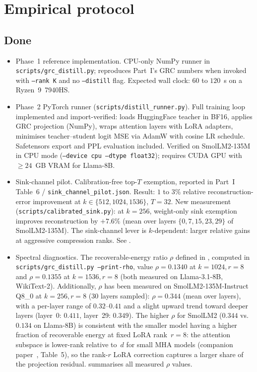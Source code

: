 \documentclass[11pt]{article}
\begin{document}
\section{Empirical protocol}
\label{sec:status}

\subsection{Done}
\begin{itemize}
\item Phase~1 reference implementation. CPU-only NumPy
      runner in \texttt{scripts/grc\_distill.py}; reproduces Part~I's
      GRC numbers when invoked with \texttt{--rank K} and no
      \texttt{--distill} flag. Expected wall clock: $60$ to $120$~s on
      a Ryzen~9~7940HS.

\item Phase~2 PyTorch runner (\texttt{scripts/distill\_runner.py}).
      Full training loop implemented and import-verified: loads
      HuggingFace teacher in BF16, applies GRC projection (NumPy),
      wraps attention layers with LoRA adapters, minimises
      teacher--student logit MSE via AdamW with cosine LR schedule.
      Safetensors export and PPL evaluation included.  Verified on
      SmolLM2-135M in CPU mode (\texttt{--device cpu --dtype float32});
      requires CUDA GPU with ${\ge}24$~GB VRAM for Llama-8B.

\item Sink-channel pilot. Calibration-free top-$T$ exemption,
      reported in Part~I Table~6 / \texttt{sink\_channel\_pilot.json}.
      Result: $1$ to $3\%$ relative reconstruction-error improvement at
      $k\in\{512,1024,1536\}$, $T{=}32$.  New measurement
      (\texttt{scripts/calibrated\_sink.py}): at $k{=}256$, weight-only
      sink exemption improves reconstruction by $+7.6\%$ (mean over
      layers $\{0,7,15,23,29\}$ of SmolLM2-135M).  The sink-channel
      lever is $k$-dependent: larger relative gains at aggressive
      compression ranks.  See .

\item Spectral diagnostics. The recoverable-energy ratio
      $\rho$ defined in , computed in
      \texttt{scripts/grc\_distill.py --print-rho}, value
      $\rho{=}0.1340$ at $k{=}1024, r{=}8$ and $\rho{=}0.1355$ at
      $k{=}1536, r{=}8$ (both measured on Llama-3.1-8B, WikiText-2).
      Additionally, $\rho$ has been measured on SmolLM2-135M-Instruct
      Q8\_0 at $k{=}256, r{=}8$ (30 layers sampled):
      $\rho{=}0.344$ (mean over layers), with a per-layer range
      of $0.32$--$0.41$ and a slight upward trend toward deeper layers
      (layer~0: $0.411$, layer~29: $0.349$).  The higher $\rho$ for
      SmolLM2 ($0.344$ vs.\ $0.134$ on Llama-8B) is consistent with
      the smaller model having a higher fraction of recoverable energy
      at fixed LoRA rank~$r{=}8$: the attention subspace is lower-rank
      relative to~$d$ for small MHA models (companion paper~\cite{stewart2026gp},
      Table~5), so the rank-$r$ LoRA correction
      captures a larger share of the projection residual.
       summarises all measured $\rho$ values.


\end{itemize}
\end{document}
